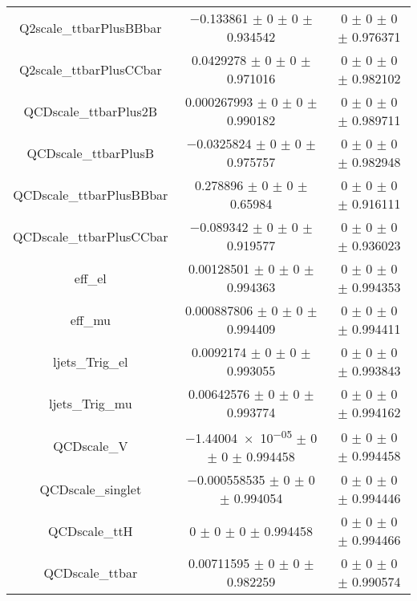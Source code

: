 \begin{table}
\begin{tabular}{ccc}
Q2scale\_ttbarPlusBBbar & \num{-0.133861} $\pm$ \num{0} $\pm$ \num{0} $\pm$ \num{0.934542} & \num{0} $\pm$ \num{0} $\pm$ \num{0} $\pm$ \num{0.976371}\\
Q2scale\_ttbarPlusCCbar & \num{0.0429278} $\pm$ \num{0} $\pm$ \num{0} $\pm$ \num{0.971016} & \num{0} $\pm$ \num{0} $\pm$ \num{0} $\pm$ \num{0.982102}\\
QCDscale\_ttbarPlus2B & \num{0.000267993} $\pm$ \num{0} $\pm$ \num{0} $\pm$ \num{0.990182} & \num{0} $\pm$ \num{0} $\pm$ \num{0} $\pm$ \num{0.989711}\\
QCDscale\_ttbarPlusB & \num{-0.0325824} $\pm$ \num{0} $\pm$ \num{0} $\pm$ \num{0.975757} & \num{0} $\pm$ \num{0} $\pm$ \num{0} $\pm$ \num{0.982948}\\
QCDscale\_ttbarPlusBBbar & \num{0.278896} $\pm$ \num{0} $\pm$ \num{0} $\pm$ \num{0.65984} & \num{0} $\pm$ \num{0} $\pm$ \num{0} $\pm$ \num{0.916111}\\
QCDscale\_ttbarPlusCCbar & \num{-0.089342} $\pm$ \num{0} $\pm$ \num{0} $\pm$ \num{0.919577} & \num{0} $\pm$ \num{0} $\pm$ \num{0} $\pm$ \num{0.936023}\\
eff\_el & \num{0.00128501} $\pm$ \num{0} $\pm$ \num{0} $\pm$ \num{0.994363} & \num{0} $\pm$ \num{0} $\pm$ \num{0} $\pm$ \num{0.994353}\\
eff\_mu & \num{0.000887806} $\pm$ \num{0} $\pm$ \num{0} $\pm$ \num{0.994409} & \num{0} $\pm$ \num{0} $\pm$ \num{0} $\pm$ \num{0.994411}\\
ljets\_Trig\_el & \num{0.0092174} $\pm$ \num{0} $\pm$ \num{0} $\pm$ \num{0.993055} & \num{0} $\pm$ \num{0} $\pm$ \num{0} $\pm$ \num{0.993843}\\
ljets\_Trig\_mu & \num{0.00642576} $\pm$ \num{0} $\pm$ \num{0} $\pm$ \num{0.993774} & \num{0} $\pm$ \num{0} $\pm$ \num{0} $\pm$ \num{0.994162}\\
QCDscale\_V & \num{-1.44004e-05} $\pm$ \num{0} $\pm$ \num{0} $\pm$ \num{0.994458} & \num{0} $\pm$ \num{0} $\pm$ \num{0} $\pm$ \num{0.994458}\\
QCDscale\_singlet & \num{-0.000558535} $\pm$ \num{0} $\pm$ \num{0} $\pm$ \num{0.994054} & \num{0} $\pm$ \num{0} $\pm$ \num{0} $\pm$ \num{0.994446}\\
QCDscale\_ttH & \num{0} $\pm$ \num{0} $\pm$ \num{0} $\pm$ \num{0.994458} & \num{0} $\pm$ \num{0} $\pm$ \num{0} $\pm$ \num{0.994466}\\
QCDscale\_ttbar & \num{0.00711595} $\pm$ \num{0} $\pm$ \num{0} $\pm$ \num{0.982259} & \num{0} $\pm$ \num{0} $\pm$ \num{0} $\pm$ \num{0.990574}\\

\end{tabular}
\end{table}

